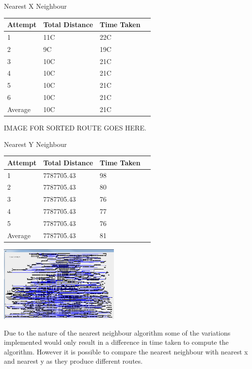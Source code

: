 \documentclass[conference,backref=page]{acmsiggraph}
\begin{document}
\begin{center}	
	
	Nearest X Neighbour
	
	\begin{tabular}{| l | l | l | l |}
		\hline
		Attempt & Total Distance & Time Taken\\ \hline
		1 & 11C & 22C \\ \hline
		2 & 9C & 19C  \\ \hline
		3 & 10C & 21C \\ \hline
		4 & 10C & 21C \\ \hline
		5 & 10C & 21C \\ \hline
		6 & 10C & 21C \\ \hline
		Average & 10C & 21C \\ \hline	
	\end{tabular}
	
	IMAGE FOR SORTED ROUTE GOES HERE.
\end{center}


\begin{center}	
	
	Nearest Y Neighbour
	
	\begin{tabular}{| l | l | l | l |}
		\hline
		Attempt & Total Distance & Time Taken\\ \hline
		1 & 7787705.43 & 98 \\ \hline
		2 & 7787705.43 & 80  \\ \hline
		3 & 7787705.43 & 76 \\ \hline
		4 & 7787705.43 & 77 \\ \hline
		5 & 7787705.43 & 76 \\ \hline
		Average & 7787705.43 & 81 \\ \hline
	\end{tabular}
	
	 \includegraphics[height=1.5in]{images/rl5915ny}
\end{center}






Due to the nature of the nearest neighbour algorithm some of the variations implemented would only result in a difference in time taken to compute the algorithm. However it is possible to compare the nearest neighbour with nearest x and nearest y as they produce different routes. 
\end{document}
